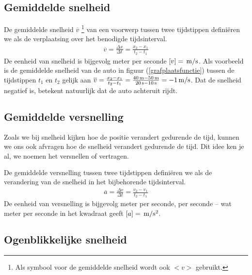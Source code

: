 \documentclass{ximera}
\begin{document}
	\subsection{Gemiddelde snelheid}
	
	De gemiddelde snelheid $\overline{v}$ \footnote{Als symbool voor de gemiddelde snelheid wordt ook $<v>$ gebruikt.} van een voorwerp tussen twee tijdstippen defini\"eren we als de verplaatsing over het benodigde tijdsinterval.
	\begin{eqnarray*}
	\overline{v}=\frac{\Delta x}{\Delta t}=\frac{x_2-x_1}{t_2-t_1}
	\end{eqnarray*}
	De eenheid van snelheid is bijgevolg meter per seconde $[v]=\rm\,m/s$. Als voorbeeld is de gemiddelde snelheid van de auto in figuur (\ref{grafplaatsfunctie}) tussen de tijdstippen $t_1$ en $t_2$ gelijk aan $\overline{v}=\frac{x_2-x_1}{t_2-t_1}=\frac{40\rm\,m-50\rm\,m}{20\rm\,s-10\rm\,s}=-1\rm\,m/s$. Dat de snelheid negatief is, betekent natuurlijk dat de auto achteruit rijdt.
	
	\subsection{Gemiddelde versnelling}
	
	Zoals we bij snelheid kijken hoe de positie verandert gedurende de tijd, kunnen we ons ook afvragen hoe de snelheid verandert gedurende de tijd. Dit idee ken je al, we noemen het versnellen of vertragen.
	
	De gemiddelde versnelling tussen twee tijdstippen defini\"eren we als de verandering van de snelheid in het bijbehorende tijdsinterval.
	\begin{eqnarray*}
	\overline{a}=\frac{\Delta v}{\Delta t}=\frac{v_2-v_1}{t_2-t_1}
	\end{eqnarray*}
	De eenheid van versnelling is bijgevolg meter per seconde, per seconde -- wat meter per seconde in het kwadraat geeft $[a]=\rm\,m/s^2$.
	
	\subsection{Ogenblikkelijke snelheid}
	
\end{document}
